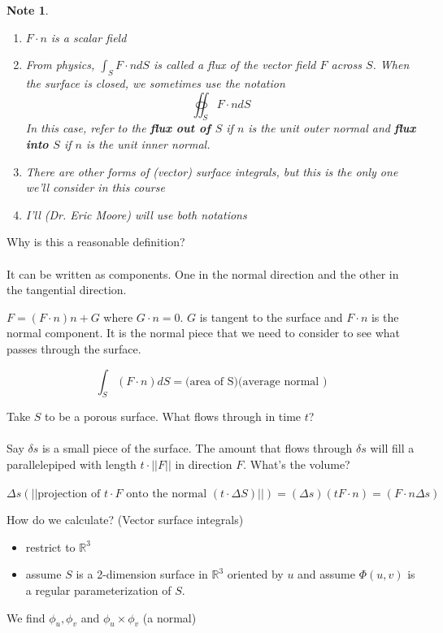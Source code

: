 \documentclass[12pt]{article}
\theoremstyle{plain}
\newtheorem*{note}{Note}
\theoremstyle{definition}
\begin{document}
\begin{note}
	\begin{enumerate}
		\item{$F \cdot n$ is a scalar field}
		\item{From physics, $\int_S F \cdot n dS$ is called a flux of the vector field $F$ across $S$. When the surface is closed, we sometimes use the notation
		$$\oiint_S F \cdot n dS $$
		In this case, refer to the \textbf{flux out of $S$} if $n$ is the unit outer normal and \textbf{flux into $S$} if $n$ is the unit inner normal.
		}
		\item{There are other forms of (vector) surface integrals, but this is the only one we'll consider in this course}
		\item{I'll (Dr. Eric Moore) will use both notations}
	\end{enumerate}
\end{note}

Why is this a reasonable definition?\\
\\
It can be written as components. One in the normal direction and the other in the tangential direction.

$F = (F \cdot n) n + G$ where $G \cdot n = 0$. $G$ is tangent to the surface and $F \cdot n$ is the normal component. It is the normal piece that we need to consider to see what passes through the surface.

$$\int_S (F \cdot n) dS = \text{(area of S)(average normal )}$$

Take $S$ to be a porous surface. What flows through in time $t$?\\
\\
Say $\delta s$ is a small piece of the surface. The amount that flows through $\delta s$ will fill a parallelepiped with length $t\cdot || F ||$ in direction $F$. What's the volume?\\
\\
$$\Delta s (||\text{projection of $t\cdot F$ onto the normal $(t\cdot \Delta S)$}||) = (\Delta s)(tF \cdot n) = (F \cdot n \Delta s)$$

How do we calculate? (Vector surface integrals)
\begin{itemize}
	\item{restrict to $\mathbb{R}^3$}
	\item{assume $S$ is a 2-dimension surface in $\mathbb{R}^3$ oriented by $u$ and assume $\Phi (u,v)$ is a regular parameterization of $S$.}
\end{itemize}
We find $\phi_u, \phi_v$ and $\phi_u \times \phi_v$ (a normal)
\end{document}
